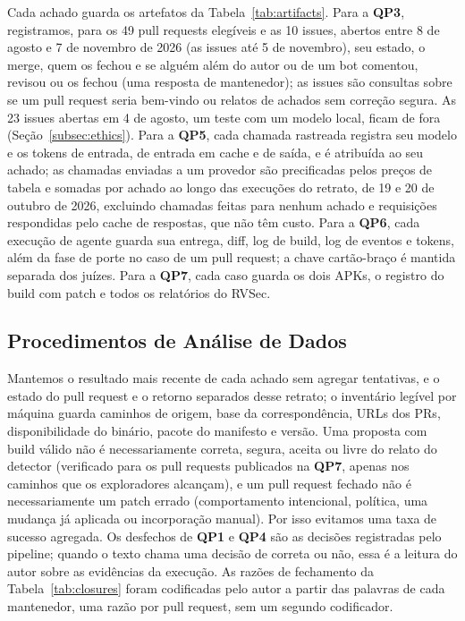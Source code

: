 \documentclass[conference]{IEEEtran}
\newcommand{\researchq}[1]{\textbf{QP#1}}
\begin{document}
Cada achado guarda os artefatos da Tabela~\ref{tab:artifacts}. Para a
\researchq{3}, registramos, para os 49 pull requests elegíveis e as 10 issues,
abertos entre 8 de agosto e 7 de novembro de 2026 (as issues até 5 de novembro), seu
estado, o merge, quem os fechou
e se alguém além do autor ou de um bot comentou, revisou ou os
fechou (uma resposta de mantenedor); as issues são consultas sobre se um pull
request seria bem-vindo ou relatos de achados sem correção segura. As 23 issues
abertas em 4 de agosto, um teste com um modelo local, ficam de fora
(Seção~\ref{subsec:ethics}). Para a
\researchq{5}, cada chamada rastreada registra seu modelo e os tokens de entrada, de entrada em cache e
de saída, e é atribuída ao seu achado; as chamadas enviadas a um provedor são precificadas pelos preços
de tabela e somadas por achado ao longo das execuções do retrato, de 19 e 20 de outubro de 2026, excluindo chamadas feitas para nenhum
achado e requisições respondidas pelo cache de respostas, que não têm custo. Para a \researchq{6}, cada execução de agente guarda sua entrega, diff, log de
build, log de eventos e tokens, além da fase de porte no caso de um pull request; a
chave cartão-braço é mantida separada dos juízes. Para a \researchq{7}, cada caso
guarda os dois APKs, o registro do build com patch e todos os relatórios do RVSec.

\subsection{Procedimentos de Análise de Dados}
\label{subsec:analysis}

Mantemos o resultado mais recente de cada achado sem agregar tentativas, e o estado do pull request
e o retorno separados desse retrato; o inventário legível por máquina guarda
caminhos de origem, base da correspondência, URLs dos PRs, disponibilidade do binário, pacote do manifesto
e versão. Uma proposta com build válido não é necessariamente correta, segura,
aceita ou livre do relato do detector (verificado para os pull
requests publicados na \researchq{7}, apenas nos caminhos que os exploradores alcançam), e um pull request
fechado não é necessariamente um patch errado (comportamento intencional, política, uma
mudança já aplicada ou incorporação manual). Por isso evitamos uma taxa de sucesso
agregada. Os desfechos de \researchq{1} e \researchq{4} são as decisões
registradas pelo pipeline; quando o texto chama uma decisão de correta ou não,
essa é a leitura do autor sobre as evidências da execução. As razões de
fechamento da Tabela~\ref{tab:closures} foram codificadas pelo autor a partir das
palavras de cada mantenedor, uma razão por pull request, sem um segundo
codificador.
\end{document}
